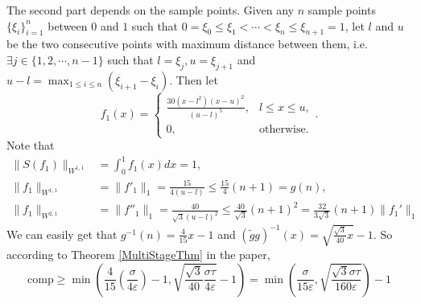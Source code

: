 The second part depends on the sample points. Given any $n$ sample points $\{\xi_i\}_{i=1}^{n}$ between $0$ and $1$ such that $0=\xi_0\leq \xi_1<\cdots<\xi_n\leq \xi_{n+1}=1$, let $l$ and $u$ be the two consecutive points with maximum distance between them, i.e. $\exists j\in \{1,2,\cdots,n-1\}$ such that $l=\xi_j, u=\xi_{j+1}$ and $u-l=\max_{1\leq i\leq n}(\xi_{i+1}-\xi_i)$. Then let
$$f_1(x)=\begin{cases}  \displaystyle  \frac{30(x-l^2)(x-u)^2}{(u-l)^5}, & l\leq x\leq u,\\[2ex]
 \displaystyle  0, & \text{otherwise}.
\end{cases}.$$
Note that
\begin{align*}
    \|S(f_1)\|_{W^{1,1}}&=\int_{0}^{1}f_1(x)dx=1,\\
    \|f_1\|_{W^{1,1}}&=\|f'_{1}\|_1=\frac{15}{4(u-l)}\leq \frac{15}{4}(n+1)=g(n),\\
    \|f_1\|_{W^{2,1}}&=\|f''_{1}\|_1=\frac{40}{\sqrt{3}(u-l)^2}\leq \frac{40}{\sqrt{3}}(n+1)^2=\frac{32}{3\sqrt{3}}(n+1)\|f_1'\|_1%
\end{align*}
We can easily get that $g^{-1}(n)=\frac{4}{15}x-1$ and $(\tilde{g}g)^{-1}(x)=\sqrt{\frac{\sqrt{3}}{40}x}-1$. So according to Theorem \ref{MultiStageThm} in the paper, $$\text{comp}\geq \min\left(\frac{4}{15}(\frac{\sigma}{4\varepsilon})-1,\sqrt{\frac{\sqrt{3}}{40}\frac{\sigma\tau}{4\varepsilon}}-1\right)=\min\left(\frac{\sigma}{15\varepsilon},\sqrt{\frac{\sqrt{3}\sigma\tau}{160\varepsilon}}\right)-1$$

%

% 